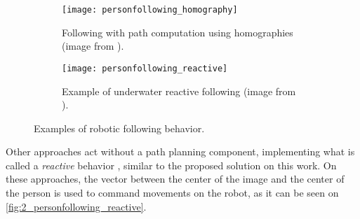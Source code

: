 \begin{figure}
	\centering
	\begin{subfigure}[t]{0.45\linewidth}
		\centering
		\texttt{[image: personfollowing\_homography]}
		\caption{Following with path computation using homographies (image from \cite{personfollowing_summary}).}
		\label{fig:2_personfollowing_homography}
	\end{subfigure}
	\begin{subfigure}[t]{0.45\linewidth}
		\centering
		
		\texttt{[image: personfollowing\_reactive]}
		\caption{Example of underwater reactive following (image from \cite{personfollowing_reactive}).}
		\label{fig:2_personfollowing_reactive}
	\end{subfigure}
	\caption{Examples of robotic following behavior.}
	\label{fig:2_personfollowing}
\end{figure}



Other approaches act without a path planning component, implementing what is called a \textit{reactive} behavior \cite{personfollowing_reactive}, similar to the proposed solution  on this work. On these approaches, the vector between the center of the image and the center of the person is used to command movements on the robot, as it can be seen on \autoref{fig:2_personfollowing_reactive}.

